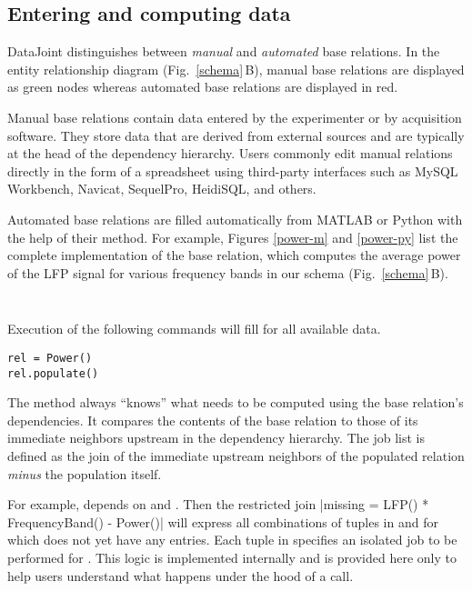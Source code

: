 \subsection*{Entering and computing data}
DataJoint distinguishes between \emph{manual} and \emph{automated} base relations. 
In the entity relationship diagram (Fig.\ \ref{schema}\,B), manual base relations are displayed as green nodes whereas automated base relations are displayed in red.

Manual base relations contain data entered by the experimenter or by acquisition software.
They store data that are derived from external sources and are typically at the head of the dependency hierarchy.
Users commonly edit manual relations directly in the form of a spreadsheet using third-party interfaces such as MySQL Workbench, Navicat, SequelPro, HeidiSQL, and others. 

Automated base relations are filled automatically from MATLAB or Python with the help of their  method. 
For example, Figures \ref{power-m} and \ref{power-py} list the complete implementation of the  base relation, which computes the average power of the LFP signal for various frequency bands in our schema (Fig.\ \ref{schema}\,B).

\begin{figure*}
\inputminted[frame=single,linenos=true]{matlab}{Power.m}
\caption{The class for the base relation  in MATLAB.}
\label{power-m}
\end{figure*}

\begin{figure*}
\inputminted[frame=single,linenos=true]{python}{power.py}
\caption{The class for the base relation  in Python.}
\label{power-py}
\end{figure*}

Execution of the following commands will fill  for all available data.
\begin{verbatim}
rel = Power()
rel.populate()
\end{verbatim}

The  method always ``knows'' what needs to be computed using the base relation's dependencies.
It compares the contents of the base relation to those of its immediate neighbors upstream in the dependency hierarchy. 
The job list is defined as the join of the immediate upstream neighbors of the populated relation \emph{minus} the population itself.

For example,  depends on  and . 
Then the restricted join 
|missing = LFP() * FrequencyBand() - Power()|
will express  all combinations of tuples in  and  for which  does not yet have any entries.
Each tuple in  specifies an isolated job to be performed for .
This logic is implemented internally and is provided here only to help users understand what happens under the hood of a  call.

